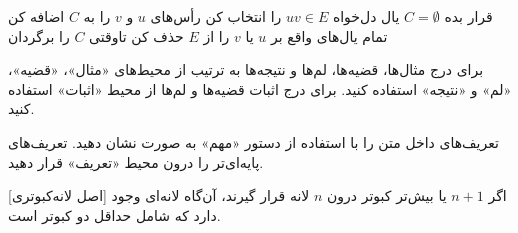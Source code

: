  قرار بده $C = \emptyset$  %
 یال دل‌‌خواه $uv \in E$ را انتخاب کن
 رأس‌های $u$ و $v$ را به $C$ اضافه کن
 تمام یال‌های واقع بر $u$ یا $v$ را از $E$ حذف کن
‌تاوقتی
 $C$ را برگردان



برای درج مثال‌ها، قضیه‌ها، لم‌ها و نتیجه‌ها به ترتیب از محیط‌های
«مثال»، «قضیه»، «لم» و «نتیجه» استفاده کنید.
برای درج اثبات قضیه‌ها و لم‌ها  از محیط «اثبات» استفاده کنید.

تعریف‌های داخل متن را با استفاده از دستور «مهم» به صورت  نشان دهید.
تعریف‌های پایه‌ای‌تر را درون محیط «تعریف» قرار دهید.

[اصل لانه‌کبوتری]
اگر $n+1$ یا بیش‌تر کبوتر درون  $n$ لانه قرار گیرند، آن‌گاه لانه‌ای 
وجود دارد که شامل حداقل دو کبوتر است.

